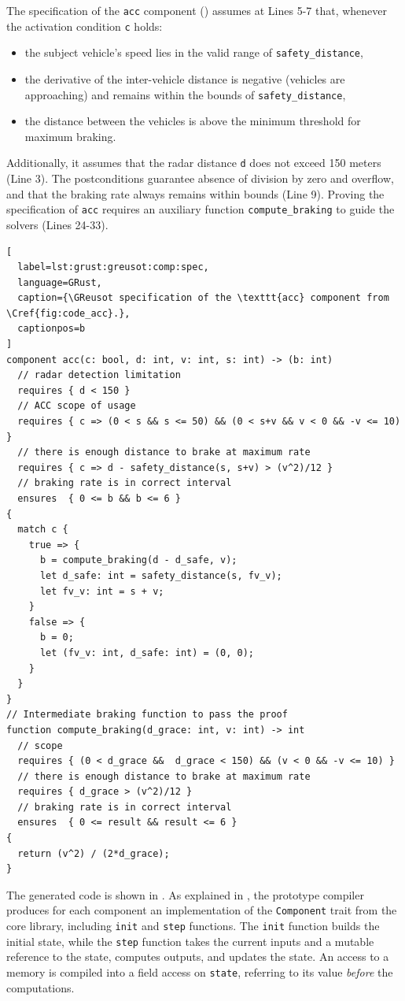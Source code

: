 The specification of the \verb|acc| component
() assumes at Lines 5-7 that, whenever the activation condition
\verb|c| holds:
\begin{itemize}
  \item the subject vehicle's speed lies in the valid range of \verb|safety_distance|,
  \item the derivative of the inter-vehicle distance is negative (vehicles are approaching) and
        remains within the bounds of \verb|safety_distance|,
  \item the distance between the vehicles is above the minimum threshold for maximum braking.
\end{itemize}
Additionally, it assumes that the radar distance \verb|d| does not exceed 150 meters (Line 3). The
postconditions guarantee absence of division by zero and overflow, and that the braking rate always
remains within bounds (Line 9). Proving the specification of \verb|acc| requires an auxiliary
function \verb|compute_braking| to guide the solvers (Lines 24-33).

\begin{lstlisting}[
  label=lst:grust:greusot:comp:spec,
  language=GRust, 
  caption={\GReusot specification of the \texttt{acc} component from \Cref{fig:code_acc}.},
  captionpos=b
]
component acc(c: bool, d: int, v: int, s: int) -> (b: int)
  // radar detection limitation
  requires { d < 150 }
  // ACC scope of usage
  requires { c => (0 < s && s <= 50) && (0 < s+v && v < 0 && -v <= 10) }
  // there is enough distance to brake at maximum rate
  requires { c => d - safety_distance(s, s+v) > (v^2)/12 }
  // braking rate is in correct interval
  ensures  { 0 <= b && b <= 6 }
{
  match c {
    true => {
      b = compute_braking(d - d_safe, v);
      let d_safe: int = safety_distance(s, fv_v);
      let fv_v: int = s + v;
    }
    false => {
      b = 0;
      let (fv_v: int, d_safe: int) = (0, 0);
    }
  }
}
// Intermediate braking function to pass the proof
function compute_braking(d_grace: int, v: int) -> int
  // scope
  requires { (0 < d_grace &&  d_grace < 150) && (v < 0 && -v <= 10) }
  // there is enough distance to brake at maximum rate
  requires { d_grace > (v^2)/12 }
  // braking rate is in correct interval
  ensures  { 0 <= result && result <= 6 }
{
  return (v^2) / (2*d_grace);
}
\end{lstlisting}

The generated code is shown in . As explained in
, the prototype \GRust compiler produces for each component an
implementation of the \texttt{Component} trait from the \GRust core library, including
\texttt{init} and \texttt{step} functions. The \texttt{init} function builds the initial state,
while the \texttt{step} function takes the current inputs and a mutable reference to the state,
computes outputs, and updates the state. An access to a memory  is compiled into a field
access on \texttt{state}, referring to its value \emph{before} the computations.

